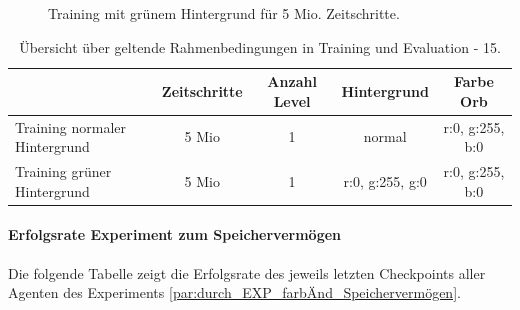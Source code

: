 \begin{figure}[htp!]
\begin{minipage}{0.48\linewidth}
        \caption{Training mit grünem Hintergrund für 5 Mio. Zeitschritte.}
        \label{fig:grph_green_80Mio_inflvl_15act_Training_evalAsTraining_5Mio2}
    \end{minipage}
\end{figure}

\begin{center}
 \begin{table}[htb!]
 \begin{center}
  \begin{tabular}{ l c c c c }
    \hline
			       				& Zeitschritte 	& Anzahl Level 	& Hintergrund	 	& Farbe Orb \\ \hline \hline
     Training normaler Hintergrund  	& 5 Mio       	& 1		&  normal			& r:0, g:255, b:0 \\ \hline
     Training grüner Hintergrund   	& 5 Mio       	& 1 		&  r:0, g:255, g:0	& r:0, g:255, b:0 \\ \hline
    \hline
  \end{tabular}
  \caption{Übersicht über geltende Rahmenbedingungen in Training und Evaluation - 15.}
  \label{tab:tab_durch_EXP_trainSetting_anh_1}
  \end{center}
 \end{table}
\end{center} 
\vfill

\paragraph{Erfolgsrate Experiment zum Speichervermögen}\label{anh_exp_erfolgsrate}
Die folgende Tabelle zeigt die Erfolgsrate des jeweils letzten Checkpoints aller Agenten des Experiments \ref{par:durch_EXP_farbÄnd_Speichervermögen}.

